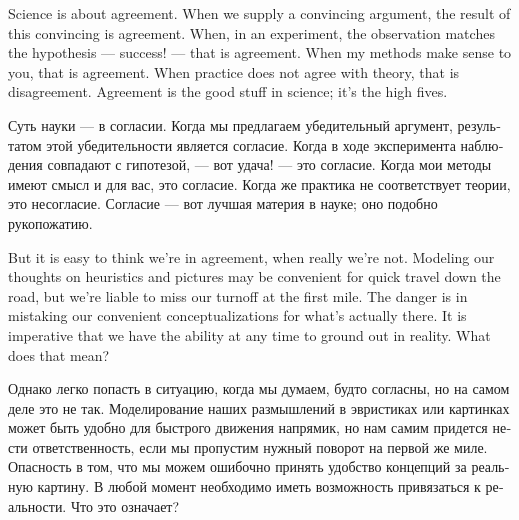 \documentclass[a4paper]{book}
\theoremstyle{myth}
\begin{document}
\begin{russian}
Science is about agreement. When we supply a convincing argument, the result of this convincing is agreement. When, in an experiment, the observation matches the hypothesis — success! — that is agreement. When my methods make sense to you, that is agreement. When practice does not agree with theory, that is disagreement. Agreement is the good stuff in science; it's the high fives.

Суть науки — в согласии. Когда мы предлагаем убедительный аргумент,  результатом этой убедительности является согласие. Когда в ходе эксперимента наблюдения совпадают с гипотезой, — вот удача! — это согласие. Когда мои методы имеют смысл и для вас, это согласие. Когда же практика не соответствует теории, это несогласие. Согласие — вот лучшая материя в науке; оно подобно рукопожатию.%

But it is easy to think we're in agreement, when really we're not. Modeling our thoughts on heuristics and pictures may be convenient for quick travel down the road, but we're liable to miss our turnoff at the first mile. The danger is in mistaking our convenient conceptualizations for what's actually there. It is imperative that we have the ability at any time to ground out in reality. What does that mean?

Однако легко попасть в ситуацию, когда мы думаем, будто согласны, но на самом деле это не так. Моделирование наших размышлений в эвристиках или картинках может быть удобно для быстрого движения напрямик, но нам самим придется нести ответственность, если мы пропустим нужный поворот на первой же миле. Опасность в том, что мы можем ошибочно принять удобство концепций за реальную картину. В любой момент необходимо иметь возможность привязаться к реальности. Что это означает? 


\end{russian}
\end{document}

